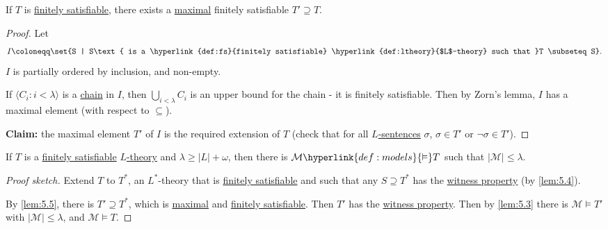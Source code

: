 \documentclass{article}
\let\models\vDash
\begin{document}
\begin{nlemma}\label{lem:5.5}
  If $T$ is \hyperlink{def:fs}{finitely satisfiable}, there exists a \hyperlink{def:maximal}{maximal} finitely satisfiable $T' \supseteq T$.
\end{nlemma}
\begin{proof}
  Let
  \begin{equation*}
    I \coloneqq \set{S | S\text{ is a \hyperlink{def:fs}{finitely satisfiable} \hyperlink{def:ltheory}{$L$-theory} such that }T \subseteq S}.
  \end{equation*}
  $I$ is partially ordered by inclusion, and non-empty.

  If $\langle C_i : i < \lambda \rangle$ is a \hyperlink{def:chain}{chain} in $I$, then $\bigcup_{i < \lambda} C_i$ is an upper bound for the chain - it is finitely satisfiable.
  Then by Zorn's lemma, $I$ has a maximal element (with respect to $\subseteq$).

  \textbf{Claim:} the maximal element $T'$ of $I$ is the required extension of $T$ (check that for all \hyperlink{def:sentence}{$L$-sentences} $\sigma$, $\sigma \in T'$ or $\lnot \sigma \in T'$).
\end{proof}
\begin{nthm}[Compactness]\label{thm:5.6}
  If $T$ is a \hyperlink{def:fs}{finitely satisfiable} \hyperlink{def:ltheory}{$L$-theory} and $\lambda \geq |L| + \omega$, then there is $\mathcal{M} \hyperlink{def:models}{\models} T$ such that $|\mathcal{M}| \leq \lambda$.
\end{nthm}
\begin{proof}[Proof sketch]
  Extend $T$ to $T^*$, an $L^*$-theory that is \hyperlink{def:fs}{finitely satisfiable} and such that any $S \supseteq T^*$ has the \hyperlink{def:wp}{witness property} (by \cref{lem:5.4}).

  By \cref{lem:5.5}, there is $T' \supseteq T^*$, which is \hyperlink{def:maximal}{maximal} and \hyperlink{def:fs}{finitely satisfiable}.
  Then $T'$ has the \hyperlink{def:wp}{witness property}.
  Then by \cref{lem:5.3} there is $\mathcal{M} \models T'$ with $|\mathcal{M}| \leq \lambda$, and $\mathcal{M} \models T$.
\end{proof}
\end{document}
